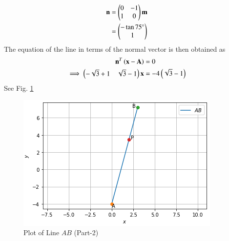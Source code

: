 \begin{enumerate}
    \begin{align}
    \label{linform/2/14/eq:line_norm_dir2}
    \mathbf{n} &= \begin{pmatrix}0&-1\\1&0\end{pmatrix}\mathbf{m} 
    \\
    &= \begin{pmatrix}-\tan75\degree\\1\end{pmatrix}
    \end{align}
    The equation of the line in terms of the normal vector is then obtained as
    \begin{align}
    \label{linform/2/14/eq:line_norm_vec2}
    \mathbf{n}^T\left(\mathbf{x}-\mathbf{A}\right) &= 0
    \\
    \implies \begin{pmatrix}-\sqrt{3}+1 &\sqrt{3}-1\end{pmatrix}  \mathbf{x} &= -4\left(\sqrt{3}-1\right)
    \end{align}
    See Fig. \ref{linform/2/14/Plot of Line $AB$ (Part-2)}

    \begin{figure}[ht]
    \centering
    \includegraphics[width=\columnwidth]{solutions/su2021/2/14/Line_Plot_Part2.PNG}
    \caption{Plot of Line $AB$ (Part-2)}
    \label{linform/2/14/Plot of Line $AB$ (Part-2)}
    \end{figure}
\end{enumerate}